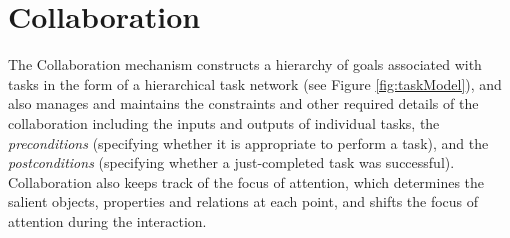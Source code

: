 \documentclass{article}
\begin{document}
% 
% 
% 
% 

\vspace*{-3mm}
\section{Collaboration}
\label{sec:collaboration}

The Collaboration mechanism constructs a hierarchy of goals associated with
tasks in the form of a hierarchical task network (see Figure
\ref{fig:taskModel}), and also manages and maintains the constraints and other
required details of the collaboration including the inputs and outputs of
individual tasks, the \textit{preconditions} (specifying whether it is
appropriate to perform a task), and the \textit{postconditions} (specifying
whether a just-completed task was successful). Collaboration also keeps track of
the focus of attention, which determines the salient objects, properties and
relations at each point, and shifts the focus of attention during the
interaction.
\end{document}
